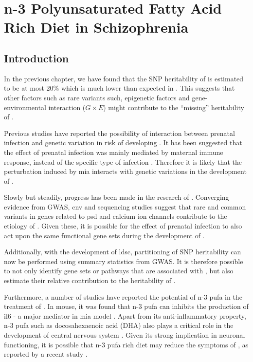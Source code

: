 \chapter{n-3 Polyunsaturated Fatty Acid Rich Diet in Schizophrenia}
\label{omegaProject}
\section{Introduction}
In the previous chapter, we have found that the \gls{SNP} heritability of  is estimated to be at most 20\% which is much lower than expected in .
This suggests that other factors such as rare variants such, epigenetic factors and gene-environmental interaction ($G\times E$) might contribute to the ``missing'' heritability of .

Previous studies have reported the possibility of interaction between prenatal infection and genetic variation in risk of developing  \citep{Tienari2004,Clarke2009}.
It has been suggested that the effect of prenatal infection was mainly mediated by maternal immune response, instead of the specific type of infection \citep{Brown2010}.
Therefore it is likely that the perturbation induced by \gls{mia} interacts with genetic variations in the development of .

Slowly but steadily, progress has been made in the research of .
Converging evidence from \gls{GWAS}, \gls{cnv} and sequencing studies suggest that rare and common variants in genes related to \gls{psd} \citep{Purcell2014,Consortium2015a} and calcium ion channels \citep{Purcell2014,Ripke2014,Szatkiewicz2014} contribute to the etiology of .
Given these, it is possible for the effect of prenatal infection to also act upon the same functional gene sets during the development of .

Additionally, with the development of \gls{ldsc}, partitioning of \gls{SNP} heritability can now be performed using summary statistics from \gls{GWAS}. 
It is therefore possible to not only identify gene sets or pathways that are associated with , but also estimate their relative contribution to the heritability of .

Furthermore, a number of studies have reported the potential of n-3 \gls{pufa} in the treatment of  \citep{Li2015,Trebble2003}. 
In mouse, it was found that n-3 \gls{pufa} can inhibits the production of \gls{il6} \citep{Trebble2003} - a major mediator in \gls{mia} model \citep{Smith2007}.
Apart from its anti-inflammatory property, n-3 \gls{pufa} such as docosahexaenoic acid (DHA) also plays a critical role in the development of central nervous system \citep{Clandinin1999,Kitajka2002}.
Given its strong implication in neuronal functioning, it is possible that n-3 \gls{pufa} rich diet may reduce the symptoms of , as reported by a recent study \citep{Li2015}.

